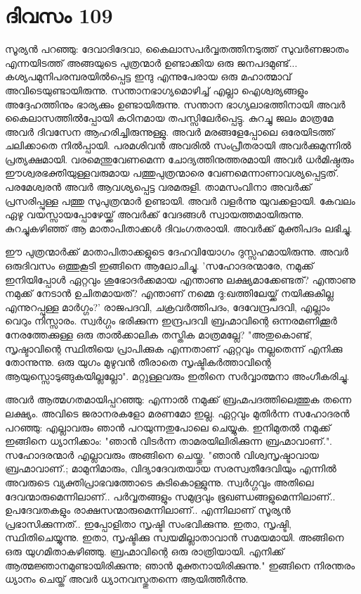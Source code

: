  
\section{ദിവസം 109}


സൂര്യന്‍ പറഞ്ഞു: ദേവാദിദേവാ, കൈലാസപര്‍വ്വതത്തിനടുത്ത്‌ സുവര്‍ണജാതം എന്നയിടത്ത്‌ അങ്ങയുടെ പുത്രന്മാര്‍ ഉണ്ടാക്കിയ ഒരു ജനപദമുണ്ട്‌... കശ്യപമുനിപരമ്പരയില്‍പ്പെട്ട ഇന്ദു എന്നുപേരായ ഒരു മഹാത്മാവ്‌ അവിടെയുണ്ടായിരുന്നു. സന്താനഭാഗ്യമൊഴിച്ച്‌ എല്ലാ ഐശ്വര്യങ്ങളും അദ്ദേഹത്തിനും ഭാര്യക്കും ഉണ്ടായിരുന്നു. സന്താന ഭാഗ്യലാഭത്തിനായി അവര്‍ കൈലാസത്തില്‍പ്പോയി കഠിനമായ തപസ്സിലേര്‍പ്പെട്ടു. കുറച്ചു ജലം മാത്രമേ അവര്‍ ദിവസേന ആഹരിച്ചിരുന്നുള്ളു. അവര്‍ മരങ്ങളേപ്പോലെ ഒരേയിടത്ത്‌ ചലിക്കാതെ നില്‍പ്പായി. പരമശിവന്‍ അവരില്‍ സംപ്രീതരായി അവര്‍ക്കുമുന്നില്‍ പ്രത്യക്ഷമായി. വരമെന്തുവേണമെന്ന ചോദ്യത്തിനുത്തരമായി അവര്‍  ധര്‍മിഷ്ഠരും ഈശ്വരഭക്തിയുള്ളവരുമായ പത്തുപുത്രന്മാരെ വേണമെന്നാണാവശ്യപ്പെട്ടത്‌. പരമേശ്വരന്‍ അവര്‍ ആവശ്യപ്പെട്ട വരമരുളി. താമസംവിനാ അവര്‍ക്ക്‌ പ്രസരിപ്പുള്ള പത്തു സുപുത്രന്മാര്‍ ഉണ്ടായി. അവര്‍ വളര്‍ന്നു യുവക്കളായി. കേവലം ഏഴു വയസ്സായപ്പോഴേയ്ക്ക്‌ അവര്‍ക്ക്‌ വേദങ്ങള്‍ സ്വായത്തമായിരുന്നു. കുറച്ചുകഴിഞ്ഞ്‌ ആ മാതാപിതാക്കള്‍ ദിവംഗതരായി. അവര്‍ക്ക്‌ മുക്തിപദം ലഭിച്ചു.

ഈ പുത്രന്മാര്‍ക്ക്‌ മാതാപിതാക്കളുടെ ദേഹവിയോഗം ദുസ്സഹമായിരുന്നു. അവര്‍ ഒരുദിവസം ഒത്തുകൂടി ഇങ്ങിനെ ആലോചിച്ചു. 'സഹോദരന്മാരേ, നമുക്ക്‌ ഇനിയിപ്പോള്‍ ഏറ്റവും ശുഭോദര്‍ക്കമായ എന്താണു ലക്ഷ്യമാക്കേണ്ടത്‌? എന്താണു നമുക്ക്‌ നേടാന്‍ ഉചിതമായത്‌? എന്താണ്‌ നമ്മെ ദു:ഖത്തിലേയ്ക്ക്‌ നയിക്കുകില്ല എന്നുറപ്പുള്ള മാര്‍ഗ്ഗം?' രാജപദവി, ചക്രവര്‍ത്തിപദം, ദേവേന്ദ്രപദവി, എല്ലാം വെറും നിസ്സാരം. സ്വര്‍ഗ്ഗം ഭരിക്കുന്ന ഇന്ദ്രപദവി ബ്രഹ്മാവിന്റെ ഒന്നരമണിക്കൂര്‍ നേരത്തേക്കുള്ള ഒരു താല്‍ക്കാലിക തസ്തിക മാത്രമല്ലേ? "അതുകൊണ്ട്‌, സൃഷ്ടാവിന്റെ സ്ഥിതിയെ പ്രാപിക്കുക എന്നതാണ്‌ ഏറ്റവും നല്ലതെന്ന് എനിക്കു തോന്നുന്നു. ഒരു യുഗം മുഴുവന്‍ തീരാതെ സൃഷ്ടികര്‍ത്താവിന്റെ ആയുസ്സൊടുങ്ങുകയില്ലല്ലോ". മറ്റുള്ളവരും ഇതിനെ സര്‍വ്വാത്മനാ അംഗീകരിച്ചു.

അവര്‍ ആത്മഗതമായിപ്പറഞ്ഞു: എന്നാല്‍ നമുക്ക്‌ ബ്രഹ്മപദത്തിലെത്തുക തന്നെ ലക്ഷ്യം. അവിടെ ജരാനരകളോ മരണമോ ഇല്ല. ഏറ്റവും മുതിര്‍ന്ന സഹോദരന്‍ പറഞ്ഞു: എല്ലാവരും ഞാന്‍ പറയുന്നതുപോലെ ചെയ്യുക. ഇനിമുതല്‍ നമുക്ക്‌ ഇങ്ങിനെ ധ്യാനിക്കാം: "ഞാന്‍ വിടര്‍ന്ന താമരയിലിരിക്കുന്ന ബ്രഹ്മാവാണ്‌.". സഹോദരന്മാര്‍ എല്ലാവരും അങ്ങിനെ ചെയ്തു. "ഞാന്‍ വിശ്വസൃഷ്ടാവായ ബ്രഹ്മാവാണ്‌.; മാമുനിമാരും, വിദ്യാദേവതയായ സരസ്വതീദേവിയും എന്നില്‍ അവരുടെ വ്യക്തിപ്രാഭവത്തോടെ കുടികൊള്ളുന്നു. സ്വര്‍ഗ്ഗവും അതിലെ ദേവന്മാരുമെന്നിലാണ്‌.. പര്‍വ്വതങ്ങളും സമുദ്രവും ഭൂഖണ്ഡങ്ങളുമെന്നിലാണ്‌.. ഉപദേവതകളും രാക്ഷസന്മാരുമെന്നിലാണ്‌.. എന്നിലാണ്‌ സൂര്യന്‍ പ്രഭാസിക്കുന്നത്‌.. ഇപ്പോളിതാ സൃഷ്ടി സംഭവിക്കുന്നു. ഇതാ, സൃഷ്ടി, സ്ഥിതിചെയ്യുന്നു. ഇതാ, സൃഷ്ടിക്കു സ്വയമില്ലാതാവാന്‍ സമയമായി. അങ്ങിനെ ഒരു യുഗമിതാകഴിഞ്ഞു. ബ്രഹ്മാവിന്റെ ഒരു രാത്രിയായി. എനിക്ക്‌ ആത്മജ്ഞാനമുണ്ടായിരിക്കുന്നു; ഞാന്‍ മുക്തനായിരിക്കുന്നു." ഇങ്ങിനെ നിരന്തരം ധ്യാനം ചെയ്ത്‌ അവര്‍ ധ്യാനവസ്തുതന്നെ ആയിത്തീര്‍ന്നു. 
